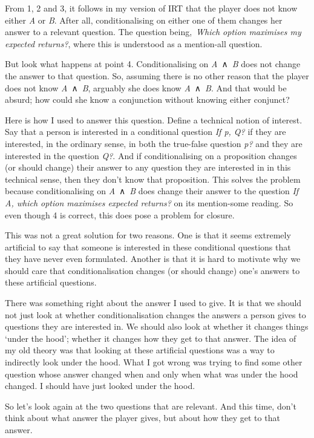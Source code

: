 \documentclass[
  12pt,
  letterpaper,
]{scrbook}
\begin{document}
From 1, 2 and 3, it follows in my version of IRT that the player does
not know either \emph{A} or \emph{B}. After all, conditionalising on
either one of them changes her answer to a relevant question. The
question being,~\emph{Which option maximises my expected returns?},
where this is understood as a mention-all question.

But look what happens at point 4. Conditionalising on
\emph{A}~∧~\emph{B} does not change the answer to that question. So,
assuming there is no other reason that the player does not know
\emph{A}~∧~\emph{B}, arguably she does know \emph{A}~∧~\emph{B}. And
that would be absurd; how could she know a conjunction without knowing
either conjunct?

Here is how I used to answer this question. Define a technical notion of
interest. Say that a person is interested in a conditional question
\emph{If p, Q?} if they are interested, in the ordinary sense, in both
the true-false question \emph{p?} and they are interested in the
question \emph{Q?}. And if conditionalising on a proposition changes (or
should change) their answer to any question they are interested in in
this technical sense, then they don't know that proposition. This solves
the problem because conditionalising on \emph{A}~∧~\emph{B} does change
their answer to the question \emph{If A, which option maximises expected
returns?} on its mention-some reading. So even though 4 is correct, this
does pose a problem for closure.

This was not a great solution for two reasons. One is that it seems
extremely artificial to say that someone is interested in these
conditional questions that they have never even formulated. Another is
that it is hard to motivate why we should care that conditionalisation
changes (or should change) one's answers to these artificial questions.

There was something right about the answer I used to give. It is that we
should not just look at whether conditionalisation changes the answers a
person gives to questions they are interested in. We should also look at
whether it changes things `under the hood'; whether it changes how they
get to that answer. The idea of my old theory was that looking at these
artificial questions was a way to indirectly look under the hood. What I
got wrong was trying to find some other question whose answer changed
when and only when what was under the hood changed. I should have just
looked under the hood.

So let's look again at the two questions that are relevant. And this
time, don't think about what answer the player gives, but about how they
get to that answer.
\end{document}
